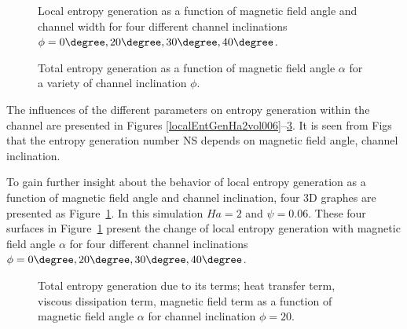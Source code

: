 \begin{figure}
\centerline{}
\vspace*{6mm}
\caption{Local entropy generation as a function of magnetic field angle and channel width for four different channel inclinations $\phi = 0\degree, 20\degree, 30\degree, 40\degree$.}
\label{localEntropy_3DHa2vol006} 
\end{figure}

\begin{figure}
\centerline{}
\vspace*{5mm}
\caption{Total entropy generation as a function of magnetic field angle $\alpha$ for a variety of channel inclination $\phi$.}
\label{totalEntGenHa2vol006} 
\end{figure}

The influences of the different parameters on entropy generation within the channel are presented in Figures \ref{localEntGenHa2vol006}--\ref{entGenModesHa2vol006}. It is seen from Figs that the entropy generation number NS depends on magnetic field angle, channel inclination.

To gain further insight about the behavior of local entropy generation as a function of magnetic field angle and channel inclination, four 3D graphes are presented as Figure~\ref{localEntropy_3DHa2vol006}. In this simulation $Ha = 2$ and $\psi = 0.06$. These four surfaces in Figure~\ref{localEntropy_3DHa2vol006} present the change of local entropy generation with magnetic field angle $\alpha$ for four different channel inclinations $\phi = 0\degree, 20\degree, 30\degree, 40\degree$.

\begin{figure}
\centerline{}
\vspace*{5mm}
\caption{Total entropy generation due to its terms; heat transfer term, viscous dissipation term, magnetic field term as a function of magnetic field angle $\alpha$ for channel inclination $\phi = 20$.}   %
\label{entGenModesHa2vol006} 
\end{figure}

